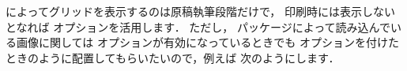  によってグリッドを表示するのは原稿執筆段階だけで，
印刷時には表示しないとなれば  オプションを活用します．
ただし， パッケージによって読み込んでいる画像に関しては
 オプションが有効になっているときでも  
オプションを付けたときのように配置してもらいたいので，例えば
次のようにします．

